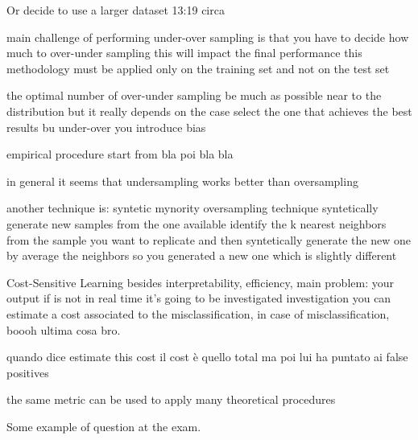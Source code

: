             Or decide to use a larger dataset 13:19 circa 

                main challenge of performing under-over sampling is that you have to decide
                    how much to over-under sampling 
                    this will impact the final performance 
                    this methodology must be applied only on the training set and not on the test set 

                    the optimal number of over-under sampling 
                    be much as possible near to the distribution
                        but it really depends on the case 
                            select the one that achieves the best results 
                        bu under-over you introduce bias 

                        empirical procedure 
                            start from bla 
                            poi bla bla 

                        in general it seems that undersampling works better than oversampling 
                
                another technique is: syntetic mynority oversampling technique
                    syntetically generate new samples from the one available
                    identify the k nearest neighbors from the sample you want to replicate
                    and then syntetically generate the new one by average the neighbors
                    so you generated a new one which is slightly different 

        Cost-Sensitive Learning 
            besides interpretability, efficiency, main problem:
                your output if is not in real time it's going to be investigated 
                investigation 
                you can estimate a cost associated to the misclassification,
                in case of misclassification, boooh ultima cosa bro.

                quando dice estimate this cost il cost è quello total ma poi lui ha puntato ai false positives

                the same metric can be used to apply many theoretical procedures 

                Some example of question at the exam.
                
